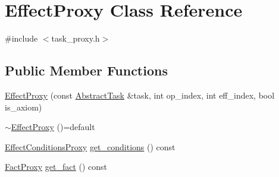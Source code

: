 \hypertarget{classEffectProxy}{\section{Effect\-Proxy Class Reference}
\label{classEffectProxy}
}


{\ttfamily \#include $<$task\-\_\-proxy.\-h$>$}

\subsection*{Public Member Functions}
\begin{DoxyCompactItemize}
\item 
\hyperlink{classEffectProxy_a57ae9eff89329c42acfe20093974f2a0}{Effect\-Proxy} (const \hyperlink{classAbstractTask}{Abstract\-Task} \&task, int op\-\_\-index, int eff\-\_\-index, bool is\-\_\-axiom)
\item 
\hyperlink{classEffectProxy_a79af0d03c64d2ccf24fae03a01e5823f}{$\sim$\-Effect\-Proxy} ()=default
\item 
\hyperlink{classEffectConditionsProxy}{Effect\-Conditions\-Proxy} \hyperlink{classEffectProxy_aaf1a977be327948a5247a9cf41ea0040}{get\-\_\-conditions} () const 
\item 
\hyperlink{classFactProxy}{Fact\-Proxy} \hyperlink{classEffectProxy_acd22da8c2db417fb7286e410eb354eb6}{get\-\_\-fact} () const 
\end{DoxyCompactItemize}


